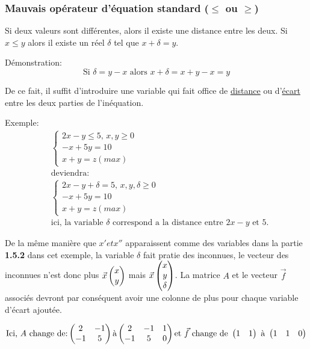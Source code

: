 \documentclass[a4paper, 11pt]{article}
\begin{document}
\newpage
\subsubsection{Mauvais opérateur d'équation standard ($\le$ ou $\ge$)} 

Si deux valeurs sont différentes, alors il existe une distance entre les deux.
Si $x \le y$ alors il existe un réel $\delta$ tel que $x + \delta = y$.

Démonstration:
\[
  \text{Si } \delta = y - x \text{ alors } x + \delta = x + y - x = y
\]

De ce fait, il suffit d'introduire une variable qui fait office de \underline{distance} ou d'\underline{écart} entre les deux parties de l'inéquation.

Exemple:
\[ \begin{aligned}
    &\begin{cases}
      2x - y \le 5  \text{, }x, y \ge 0  \\
      -x + 5y = 10 \\
      x + y = z (max)
    \end{cases} \\
	&\text{deviendra:} \\
    &\begin{cases}
      2x - y + \delta = 5  \text{, }x, y, \delta \ge 0  \\
      -x + 5y = 10 \\
      x + y = z (max)
    \end{cases} \\
	&\text{ici, la variable $\delta$ correspond a la distance entre $2x - y$ et $5$.}
	\end{aligned}
\]

De la même manière que $x' et x''$ apparaissent comme des variables dans la partie \textbf{1.5.2} dans cet exemple, la variable $\delta$ fait pratie des inconnues, le vecteur des inconnues
n'est donc plus $\vec{x} \begin{pmatrix} x \\ y \end{pmatrix}$ mais $\vec{x} \begin{pmatrix} x \\ y \\ \delta \end{pmatrix}$.
La matrice $A$ et le vecteur $\vec{f}$ associés devront par conséquent avoir une colonne de plus pour chaque variable d'écart ajoutée.

\[
  \text{Ici, $A$ change de:} \\
  \begin{pmatrix}
     2 & -1 \\
    -1 &  5
  \end{pmatrix} \\
  \text{à} \\
  \begin{pmatrix}
     2 & -1 & 1 \\
    -1 &  5 & 0
  \end{pmatrix} \\
  \text{et } \vec{f} \text{ change de } \begin{pmatrix} 1 & 1 \end{pmatrix} \text{ à } \begin{pmatrix} 1 & 1 & 0 \end{pmatrix}
\]
\end{document}
